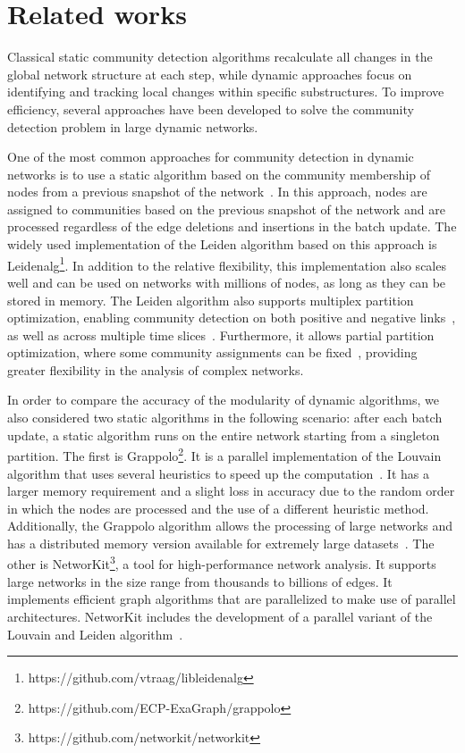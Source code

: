 \section{Related works}
\label{S:2}
Classical static community detection algorithms recalculate all changes in the global network structure at each step, while dynamic approaches focus on identifying and tracking local changes within specific substructures. To improve efficiency, several approaches have been developed to solve the community detection problem in large dynamic networks.

One of the most common approaches for community detection in dynamic networks is to use a static algorithm based on the community membership of nodes from a previous snapshot of the network~\cite{AG10}. In this approach, nodes are assigned to communities based on the previous snapshot of the network and are processed regardless of the edge deletions and insertions in the batch update. The widely used implementation of the Leiden algorithm based on this approach is Leidenalg\footnote{https://github.com/vtraag/libleidenalg}. In addition to the relative flexibility, this implementation also scales well and can be used on networks with millions of nodes, as long as they can be stored in memory. The Leiden algorithm also supports multiplex partition optimization, enabling community detection on both positive and negative links~\cite{TB09}, as well as across multiple time slices~\cite{MRM10}. Furthermore, it allows partial partition optimization, where some community assignments can be fixed~\cite{ZBJ19}, providing greater flexibility in the analysis of complex networks.

In order to compare the accuracy of the modularity of dynamic algorithms, we also considered two static algorithms in the following scenario: after each batch update, a static algorithm runs on the entire network starting from a singleton partition. The first is Grappolo\footnote{https://github.com/ECP-ExaGraph/grappolo}. It is a parallel implementation of the Louvain algorithm that uses several heuristics to speed up the computation~\cite{LHK14}. It has a larger memory requirement and a slight loss in accuracy due to the random order in which the nodes are processed and the use of a different heuristic method. Additionally, the Grappolo algorithm allows the processing of large networks and has a distributed memory version available for extremely large datasets~\cite{GHT18}. The other is NetworKit\footnote{https://github.com/networkit/networkit}, a tool for high-performance network analysis. It supports large networks in the size range from thousands to billions of edges. It implements efficient graph algorithms that are parallelized to make use of parallel architectures. NetworKit includes the development of a parallel variant of the Louvain and Leiden algorithm~\cite{SM13}.

